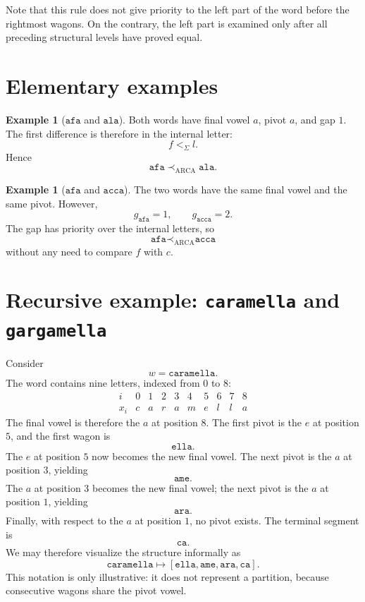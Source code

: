 \documentclass[11pt,a4paper]{article}
\theoremstyle{definition}
\newtheorem{example}[theorem]{Example}
\theoremstyle{remark}
\newcommand{\ARCA}{\mathrm{ARCA}}
\newcommand{\precA}{\prec_{\ARCA}}
\begin{document}
Note that this rule does not give priority to the left part of the word before the rightmost wagons. On the contrary, the left part is examined only after all preceding structural levels have proved equal.

\section{Elementary examples}

\begin{example}[$\texttt{afa}$ and $\texttt{ala}$]
Both words have final vowel $a$, pivot $a$, and gap $1$. The first difference is therefore in the internal letter:
\[
  f<_{\Sigma}l.
\]
Hence
\[
  \texttt{afa}\precA\texttt{ala}.
\]
\end{example}

\begin{example}[$\texttt{afa}$ and $\texttt{acca}$]
The two words have the same final vowel and the same pivot. However,
\[
  g_{\texttt{afa}}=1,\qquad g_{\texttt{acca}}=2.
\]
The gap has priority over the internal letters, so
\[
  \texttt{afa}\precA\texttt{acca}
\]
without any need to compare $f$ with $c$.
\end{example}

\section{Recursive example: \texttt{caramella} and \texttt{gargamella}}

Consider
\[
  w=\texttt{caramella}.
\]
The word contains nine letters, indexed from $0$ to $8$:
\[
\begin{array}{c|ccccccccc}
 i   &0&1&2&3&4&5&6&7&8\\
\hline
 x_i &c&a&r&a&m&e&l&l&a
\end{array}
\]
The final vowel is therefore the $a$ at position $8$. The first pivot is the $e$ at position $5$, and the first wagon is
\[
  \boxed{\texttt{ella}}.
\]
The $e$ at position $5$ now becomes the new final vowel. The next pivot is the $a$ at position $3$, yielding
\[
  \boxed{\texttt{ame}}.
\]
The $a$ at position $3$ becomes the new final vowel; the next pivot is the $a$ at position $1$, yielding
\[
  \boxed{\texttt{ara}}.
\]
Finally, with respect to the $a$ at position $1$, no pivot exists. The terminal segment is
\[
  \boxed{\texttt{ca}}.
\]
We may therefore visualize the structure informally as
\[
  \texttt{caramella}\longmapsto
  [\texttt{ella},\texttt{ame},\texttt{ara},\texttt{ca}].
\]
This notation is only illustrative: it does not represent a partition, because consecutive wagons share the pivot vowel.
\end{document}
